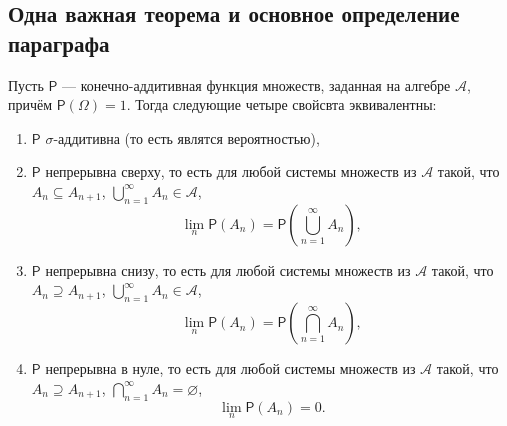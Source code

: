 \subsection{Одна важная теорема и основное определение параграфа}
\begin{theorem}\label{the:nepr-P}
	Пусть $ \mathsf P $ --- конечно-аддитивная функция множеств, заданная на
	алгебре $ \mathscr A $, причём $ \mathsf P(\Omega) = 1 $. Тогда следующие
	четыре свойсвта эквивалентны:
	\begin{enumerate}[label={\rm\roman*)}]
		\item $ \mathsf P $ $ \sigma $-аддитивна (то есть являтся вероятностью),
		\item $ \mathsf P $ непрерывна сверху, то есть для любой системы множеств из
			$ \mathscr A $ такой, что $ A_n \subseteq A_{n+1} $, $
			\bigcup_{n=1}^\infty A_n \in \mathscr A $, 
			\[
				\lim_{n} \mathsf P(A_n) = \mathsf P \left( \bigcup_{n=1}^\infty A_n
				\right),
			\]
		\item $ \mathsf P $ непрерывна снизу, то есть для любой системы множеств из
			$ \mathscr A $ такой, что $ A_n \supseteq A_{n+1} $, $
			\bigcup_{n=1}^\infty A_n \in \mathscr A $, 
			\[
				\lim_n \mathsf P(A_n) = \mathsf P \left( \bigcap_{n=1}^\infty A_n
				\right),
			\]
		\item $ \mathsf P $ непрерывна в нуле, то есть для любой системы множеств из
			$ \mathscr A $ такой, что $ A_{n} \supseteq A_{n+1} $, $
			\bigcap_{n=1}^\infty A_n = \varnothing $, 
			\[
					\lim_n \mathsf P(A_n) = 0.
			\]
	\end{enumerate}
\end{theorem}
